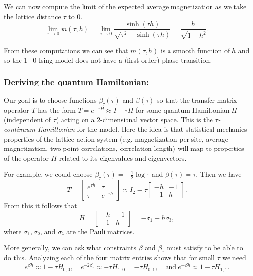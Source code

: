 \documentclass[10pt,reqno]{amsart}
\numberwithin{equation}{section}
\begin{document}
	We can now compute the limit of the expected average magnetization as we take the lattice distance $\tau$ to 0.
		\[ \lim_{\tau \to 0} m(\tau,h) = \lim_{\tau \to 0} \frac{\sinh(\tau h)}{\sqrt{\tau^2+\sinh(\tau h)}} = \frac{h}{\sqrt{1+h^2}}. \]
		
	From these computations we can see that $m(\tau,h)$ is a smooth function of $h$ and so the 1+0 Ising model does not have a (first-order) phase transition.
	
	\subsubsection{Deriving the quantum Hamiltonian:}
	
	Our goal is to choose functions $\beta_\tau(\tau)$ and $\beta(\tau)$ so that the transfer matrix operator $T$ has the form $T=e^{-\tau H} \approx I-\tau H$ for some quantum Hamiltonian $H$ (independent of $\tau$) acting on a $2$-dimensional vector space. 
	This is the \emph{$\tau$-continuum Hamiltonian} for the model. 
	Here the idea is that statistical mechanics properties of the lattice action system (e.g. magnetization per site, average magnetization, two-point correlations, correlation length) will map to properties of the operator $H$ related to its eigenvalues and eigenvectors.
	
	For example, we could choose $\beta_\tau(\tau)=-\frac{1}{2}\log \tau$ and $\beta(\tau)=\tau$. Then we have \[T=\begin{bmatrix}
	e^{\tau h} & \tau \\
	\tau & e^{-\tau h}
	\end{bmatrix} \approx I_2-\tau\begin{bmatrix}
	-h & -1 \\
	-1 & h
	\end{bmatrix}.\] 
	From this it follows that \[H=\begin{bmatrix}
	-h & -1 \\
	-1 & h
	\end{bmatrix}=-\sigma_1-h\sigma_3, \] where $\sigma_1,\sigma_2$, and $\sigma_3$ are the Pauli matrices. 
	
	More generally, we can ask what constraints $\beta$ and $\beta_\tau$ must satisfy to be able to do this. 
	Analyzing each of the four matrix entries shows that for small $\tau$ we need 
	\[e^{\beta h} \approx 1-\tau H_{0,0}, \quad e^{-2\beta_\tau} \approx -\tau H_{1,0}=-\tau H_{0,1},\quad \text{and} \ e^{-\beta h} \approx 1- \tau H_{1,1}. \]
	
\end{document}

